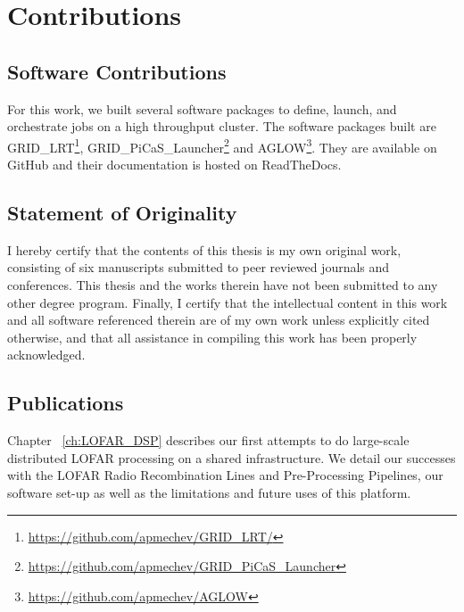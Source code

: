 \section{Contributions}



\subsection{Software Contributions}
 
For this work, we built several software packages to define, launch, and orchestrate jobs on a high throughput cluster. The software packages built are GRID\_LRT\footnote{\url{https://github.com/apmechev/GRID_LRT/}}, GRID\_PiCaS\_Launcher\footnote{\url{https://github.com/apmechev/GRID_PiCaS_Launcher}} and AGLOW\footnote{\url{https://github.com/apmechev/AGLOW}}. They are available on GitHub and their documentation is hosted on ReadTheDocs. 


\subsection{Statement of Originality}

I hereby certify that the contents of this thesis is my own original work, consisting of six manuscripts submitted to peer reviewed journals and conferences. This thesis and the works therein have not been submitted to any other degree program. Finally, I certify that the intellectual content in this work and all software referenced therein are of my own work unless explicitly cited otherwise, and that all assistance in compiling this work has been properly acknowledged.

\subsection{Publications}

Chapter ~\ref{ch:LOFAR_DSP} describes our first attempts to do large-scale distributed LOFAR processing on a shared infrastructure. We detail our successes with the LOFAR Radio Recombination Lines and Pre-Processing Pipelines, our software set-up as well as the limitations and future uses of this platform.  


